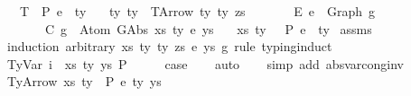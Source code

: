 \begin{isabellebody}
\ \ \ T{\isacharcolon}{\kern0pt}\ {\isachardoublequoteopen}{\isasymGamma}\ {\isasymturnstile}{\isacharbraceleft}{\kern0pt}P{\isacharbraceright}{\kern0pt}\ e{\isacharprime}{\kern0pt}\ {\isacharcolon}{\kern0pt}\ ty{\isachardoublequoteclose}\isanewline
\ \ \ ty{\isacharcolon}{\kern0pt}\ {\isachardoublequoteopen}ty\ {\isacharequal}{\kern0pt}\ TArrow\ ty{}\ ty{}\ zs{\isachardoublequoteclose}\isanewline
\ \ \ \ \ \ \ E{\isacharcolon}{\kern0pt}\ {\isachardoublequoteopen}e{\isacharprime}{\kern0pt}\ {\isacharequal}{\kern0pt}\ Graph\ g{\isacharprime}{\kern0pt}{\isachardoublequoteclose}\isanewline
\ \ \ \ \ \ \ C{\isacharcolon}{\kern0pt}\ {\isachardoublequoteopen}g{\isacharprime}{\kern0pt}\ {\isasymsimeq}\ Atom\ {\isacharparenleft}{\kern0pt}GAbs\ xs\ ty{}\ e{\isacharparenright}{\kern0pt}\ ys{\isachardoublequoteclose}\isanewline
\ \ \ {\isachardoublequoteopen}{\isacharparenleft}{\kern0pt}xs{\isacharcomma}{\kern0pt}\ ty{}{\isacharparenright}{\kern0pt}\ {\isacharhash}{\kern0pt}\ {\isasymGamma}\ {\isasymturnstile}{\isacharbraceleft}{\kern0pt}P{\isacharbraceright}{\kern0pt}\ e\ {\isacharcolon}{\kern0pt}\ ty{}{\isachardoublequoteclose}\isanewline
%
\isadelimproof
%
\endisadelimproof
%
\isatagproof
{}\isamarkupfalse%
\ assms\isanewline
{}\isamarkupfalse%
\ {\isacharparenleft}{\kern0pt}induction\ arbitrary{\isacharcolon}{\kern0pt}\ xs\ ty{}\ ty{}\ zs\ e\ ys\ g{\isacharprime}{\kern0pt}\ rule{\isacharcolon}{\kern0pt}\ typing{\isachardot}{\kern0pt}induct{\isacharparenright}{\kern0pt}\isanewline
\ \ \isamarkupfalse%
\ {\isacharparenleft}{\kern0pt}TyVar\ i\ {\isasymGamma}\ xs\ ty\ ys\ P{\isacharparenright}{\kern0pt}\isanewline
\ \ \isamarkupfalse%
\ \isamarkupfalse%
\ {\isacharquery}{\kern0pt}case\isanewline
\ \ \isamarkupfalse%
\ auto\isanewline
\ \ \isamarkupfalse%
\ {\isacharparenleft}{\kern0pt}simp\ add{\isacharcolon}{\kern0pt}\ abs{\isacharunderscore}{\kern0pt}var{\isacharunderscore}{\kern0pt}cong{\isacharunderscore}{\kern0pt}inv{\isacharparenright}{\kern0pt}\isanewline
{}\isamarkupfalse%
\isanewline
\ \ \isamarkupfalse%
\ {\isacharparenleft}{\kern0pt}TyArrow\ xs{\isacharprime}{\kern0pt}\ ty{}{\isacharprime}{\kern0pt}\ {\isasymGamma}\ P\ e{}{\isacharprime}{\kern0pt}\ ty{}{\isacharprime}{\kern0pt}\ ys{\isacharprime}{\kern0pt}{\isacharparenright}{\kern0pt}\isanewline

\end{isabellebody}
